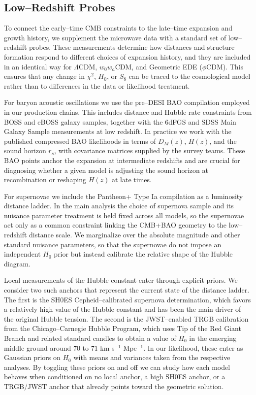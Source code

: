 \documentclass[a4paper,11pt]{article}
\begin{document}
\subsection{Low--Redshift Probes}
\label{sec:lowz}

To connect the early--time CMB constraints to the late--time expansion and growth history, we supplement the microwave data with a standard set of low--redshift probes. These measurements determine how distances and structure formation respond to different choices of expansion history, and they are included in an identical way for $\Lambda$CDM, $w_0 w_a$CDM, and Geometric EDE ($\phi$CDM). This ensures that any change in $\chi^2$, $H_0$, or $S_8$ can be traced to the cosmological model rather than to differences in the data or likelihood treatment.

For baryon acoustic oscillations we use the pre--DESI BAO compilation employed in our production chains. This includes distance and Hubble rate constraints from BOSS and eBOSS galaxy samples, together with the 6dFGS and SDSS Main Galaxy Sample measurements at low redshift. In practice we work with the published compressed BAO likelihoods in terms of $D_M(z)$, $H(z)$, and the sound horizon $r_s$, with covariance matrices supplied by the survey teams. These BAO points anchor the expansion at intermediate redshifts and are crucial for diagnosing whether a given model is adjusting the sound horizon at recombination or reshaping $H(z)$ at late times.

For supernovae we include the Pantheon+ Type Ia compilation as a luminosity distance ladder. In the main analysis the choice of supernova sample and its nuisance parameter treatment is held fixed across all models, so the supernovae act only as a common constraint linking the CMB+BAO geometry to the low--redshift distance scale. We marginalize over the absolute magnitude and other standard nuisance parameters, so that the supernovae do not impose an independent $H_0$ prior but instead calibrate the relative shape of the Hubble diagram.

Local measurements of the Hubble constant enter through explicit priors. We consider two such anchors that represent the current state of the distance ladder. The first is the SH0ES Cepheid--calibrated supernova determination, which favors a relatively high value of the Hubble constant and has been the main driver of the original Hubble tension. The second is the JWST--enabled TRGB calibration from the Chicago--Carnegie Hubble Program, which uses Tip of the Red Giant Branch and related standard candles to obtain a value of $H_0$ in the emerging middle ground around $70$ to $71$ km s$^{-1}$ Mpc$^{-1}$. In our likelihood, these enter as Gaussian priors on $H_0$ with means and variances taken from the respective analyses. By toggling these priors on and off we can study how each model behaves when conditioned on no local anchor, a high SH0ES anchor, or a TRGB/JWST anchor that already points toward the geometric solution.
\end{document}
